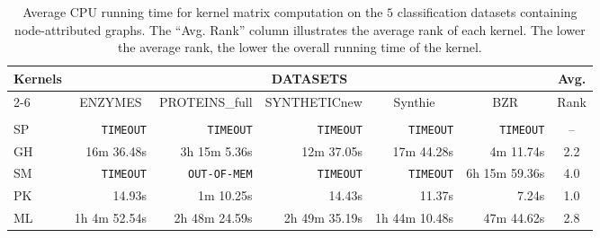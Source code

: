 \documentclass[twoside,11pt]{article}
\begin{document}
\begin{table}[t]
\centering
\scriptsize
\def\arraystretch{1.1}
\begin{tabular}{lrrrrrc} \toprule
\multirow{3}{*}{Kernels} & \multicolumn{5}{c}{DATASETS} & \multirow{2}{*}{Avg.} \\ \cline{2-6}
& \multicolumn{1}{c}{\multirow{2}{*}{ENZYMES}} & \multicolumn{1}{c}{\multirow{2}{*}{PROTEINS\_full}} & \multicolumn{1}{c}{\multirow{2}{*}{SYNTHETICnew}} & \multicolumn{1}{c}{\multirow{2}{*}{Synthie}} & \multicolumn{1}{c}{\multirow{2}{*}{BZR}} & \multirow{2}{*}{Rank} \\ 
& & & & & \\ 
\midrule
SP & \texttt{TIMEOUT} & \texttt{TIMEOUT} & \texttt{TIMEOUT} & \texttt{TIMEOUT} & \texttt{TIMEOUT} & -- \\
GH & 16m 36.48s & 3h 15m 5.36s & 12m 37.05s & 17m 44.28s & 4m 11.74s & 2.2 \\ 
SM & \texttt{TIMEOUT} & \texttt{OUT-OF-MEM} & \texttt{TIMEOUT} & \texttt{TIMEOUT} & 6h 15m 59.36s & 4.0 \\ 
PK & 14.93s & 1m 10.25s & 14.43s & 11.37s & 7.24s & 1.0 \\ 
ML & 1h 4m 52.54s & 2h 48m 24.59s & 2h 49m 35.19s & 1h 44m 10.48s & 47m 44.62s & 2.8 \\ 
\bottomrule
\end{tabular}
\caption{Average CPU running time for kernel matrix computation on the $5$ classification datasets containing node-attributed graphs. The ``Avg. Rank'' column illustrates the average rank of each kernel. The lower the average rank, the lower the overall running time of the kernel.}
\label{tab:runtimes_attributed}
\end{table}
\end{document}
